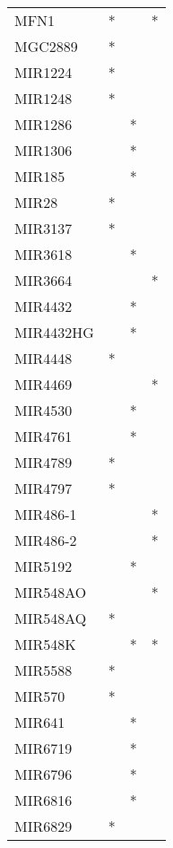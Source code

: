 \begin{longtable}{lccc}
MFN1             &     * &    &       * \\
MGC2889          &     * &    &         \\
MIR1224          &     * &    &         \\
MIR1248          &     * &    &         \\
MIR1286          &       &  * &         \\
MIR1306          &       &  * &         \\
MIR185           &       &  * &         \\
MIR28            &     * &    &         \\
MIR3137          &     * &    &         \\
MIR3618          &       &  * &         \\
MIR3664          &       &    &       * \\
MIR4432          &       &  * &         \\
MIR4432HG        &       &  * &         \\
MIR4448          &     * &    &         \\
MIR4469          &       &    &       * \\
MIR4530          &       &  * &         \\
MIR4761          &       &  * &         \\
MIR4789          &     * &    &         \\
MIR4797          &     * &    &         \\
MIR486-1         &       &    &       * \\
MIR486-2         &       &    &       * \\
MIR5192          &       &  * &         \\
MIR548AO         &       &    &       * \\
MIR548AQ         &     * &    &         \\
MIR548K          &       &  * &       * \\
MIR5588          &     * &    &         \\
MIR570           &     * &    &         \\
MIR641           &       &  * &         \\
MIR6719          &       &  * &         \\
MIR6796          &       &  * &         \\
MIR6816          &       &  * &         \\
MIR6829          &     * &    &         \\

\end{longtable}
